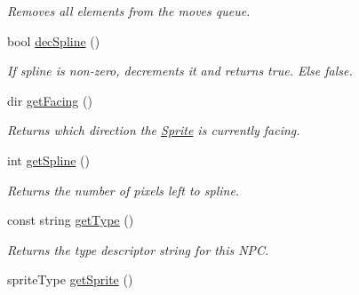 \begin{DoxyCompactItemize}
\begin{DoxyCompactList}\small\item\em Removes all elements from the moves queue. \end{DoxyCompactList}\item 
bool \hyperlink{class_sprite_af880e3cfcd03b6de68171eef82dc6a69}{dec\+Spline} ()\hypertarget{class_sprite_af880e3cfcd03b6de68171eef82dc6a69}{}\label{class_sprite_af880e3cfcd03b6de68171eef82dc6a69}

\begin{DoxyCompactList}\small\item\em If spline is non-\/zero, decrements it and returns true. Else false. \end{DoxyCompactList}\item 
dir \hyperlink{class_sprite_a6bf9e87449da385e99c02586eadf5de6}{get\+Facing} ()\hypertarget{class_sprite_a6bf9e87449da385e99c02586eadf5de6}{}\label{class_sprite_a6bf9e87449da385e99c02586eadf5de6}

\begin{DoxyCompactList}\small\item\em Returns which direction the \hyperlink{class_sprite}{Sprite} is currently facing. \end{DoxyCompactList}\item 
int \hyperlink{class_sprite_aad5e5beb45ec5eae6fe8d096d5ebef68}{get\+Spline} ()\hypertarget{class_sprite_aad5e5beb45ec5eae6fe8d096d5ebef68}{}\label{class_sprite_aad5e5beb45ec5eae6fe8d096d5ebef68}

\begin{DoxyCompactList}\small\item\em Returns the number of pixels left to spline. \end{DoxyCompactList}\item 
const string \hyperlink{class_sprite_a58c0213b779c1174473852a090efaa72}{get\+Type} ()\hypertarget{class_sprite_a58c0213b779c1174473852a090efaa72}{}\label{class_sprite_a58c0213b779c1174473852a090efaa72}

\begin{DoxyCompactList}\small\item\em Returns the type descriptor string for this N\+PC. \end{DoxyCompactList}\item 
sprite\+Type \hyperlink{class_sprite_a01742e39c9f18622a094a187d6858912}{get\+Sprite} ()\hypertarget{class_sprite_a01742e39c9f18622a094a187d6858912}{}\label{class_sprite_a01742e39c9f18622a094a187d6858912}


\end{DoxyCompactItemize}
